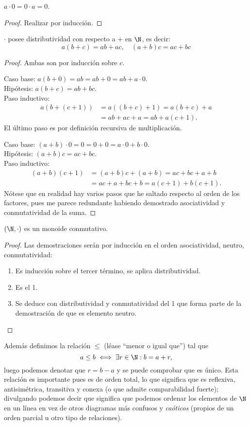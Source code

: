 \documentclass[11pt,oneside]{book}
\begin{document}
\begin{lem}
$a\cdot 0=0\cdot a=0$.
\end{lem}
\begin{proof}
Realizar por inducción.
\end{proof}
\begin{thm}
$\cdot$ posee distributividad con respecto a $+$ en $\N$, es decir:
$$a(b+c)=ab+ac,\quad(a+b)c=ac+bc$$
\end{thm}
\begin{proof}
Ambas son por inducción sobre $c$.

Caso base: $a(b+0)=ab=ab+0=ab+a\cdot 0$.\\
Hipótesis: $a(b+c)=ab+bc$.\\
Paso inductivo:
\begin{align*}
a(b+(c+1))&=a((b+c)+1)=a(b+c)+a\\
&=ab+ac+a=ab+a(c+1).
\end{align*}
El último paso es por definición recursiva de multiplicación.

Caso base: $(a+b)\cdot 0=0=0+0=a\cdot 0+b\cdot 0$.\\
Hipótesis: $(a+b)c=ac+bc$.\\
Paso inductivo:
\begin{align*}
(a+b)(c+1)&=(a+b)c+(a+b)=ac+bc+a+b\\
&=ac+a+bc+b=a(c+1)+b(c+1).
\end{align*}
Nótese que en realidad hay varios pasos que he saltado respecto al orden de los factores, pues me parece redundante habiendo demostrado asociatividad y conmutatividad de la suma.
\end{proof}
\begin{thm}
$(\N,\cdot)$ es un monoide conmutativo.
\end{thm}
\begin{proof}
Las demostraciones serán por inducción en el orden asociatividad, neutro, conmutatividad:
\begin{enumerate}
	\item Es inducción sobre el tercer término, se aplica distributividad.
	\item Es el 1.
	\item Se deduce con distributividad y conmutatividad del 1 que forma parte de la demostración de que es elemento neutro.
\end{enumerate}
\end{proof}
Además definimos la relación $\leq$ (léase ``menor o igual que'') tal que
$$a\leq b\iff\exists r\in\N:b=a+r,$$
luego podemos denotar que $r=b-a$ y se puede comprobar que es único. Esta relación es importante pues es de orden total, lo que significa que es reflexiva, antisimétrica, transitiva y conexa (o que admite comparabilidad fuerte); divulgando podemos decir que significa que podemos ordenar los elementos de $\N$ en un línea en vez de otros diagramas más confusos y \textit{caóticos} (propios de un orden parcial u otro tipo de relaciones).
\end{document}
